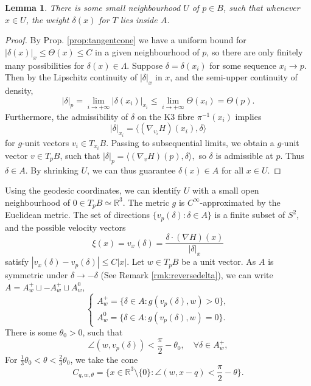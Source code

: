 \documentclass{article}
\newtheorem{lem}[thm]{Lemma}
\theoremstyle{definition}
\newcommand{\R}{\mathbb{R}}
\begin{document}
			\begin{lem}
   There is some small neighbourhood $U$ of $p\in B$, such that whenever $x\in U$,  the weight $\delta(x)$ for $T$ lies inside $A$.
			\end{lem}
			
			\begin{proof}
	By Prop. \ref{prop:tangentcone} we have a uniform bound for $|\delta(x)|_x\leq \Theta(x) \leq C$ in a given neighbourhood of $p$, so there are only finitely many possibilities for $\delta(x)\in \Lambda$. Suppose $\delta=\delta(x_i) $ for some sequence $x_i\to p$. Then by the Lipschitz continuity of $|\delta|_x$ in $x$, and the semi-upper continuity of density,
		\[
		|\delta|_p = \lim_{i\to +\infty} |\delta(x_i)|_{x_i}  \leq  \lim_{i\to +\infty} \Theta(x_i) = \Theta(p).
		\]
		Furthermore, the admissibility of $\delta$ on the K3 fibre $\pi^{-1}(x_i)$ implies
		\[
		|\delta|_{x_i}= \langle (\nabla_{v_i} H)(x_i), \delta\rangle 
		\]
		for $g$-unit vectors $v_i\in T_{x_i} B$. Passing to subsequential limits, we obtain a $g$-unit vector $v\in T_p B$, such that 
	$
			|\delta|_p = \langle (\nabla_{v} H)(p), \delta\rangle ,
	$
		so $\delta$ is admissible at $p$. Thus $\delta\in A$. By shrinking $U$, we can thus guarantee $\delta(x)\in A$ for all $x\in U$.
			\end{proof}
			
			
			
			
		
			
			
			
		Using the geodesic coordinates, we can identify $U$ with a small open neighbourhood of $0\in T_p B\simeq \R^3$.  The metric $g$ is $C^\infty$-approximated by the Euclidean metric. The set of directions
	$
		\{      v_p(\delta):  \delta\in A     \}
$
is a finite subset of $S^2$, and the possible velocity vectors
\[
\xi(x)= v_x(\delta)=  \frac{  \delta\cdot (\nabla H)(x)   }{     |\delta|_x     }
\]
satisfy $|v_x(\delta)- v_p(\delta)| \leq C |x|$. Let $w\in T_p B$ be a unit vector. As $A$ is symmetric under $\delta\to -\delta$ (See Remark \ref{rmk:reversedelta}), 
 we can write $A=A_w^+\sqcup -A_w^+\sqcup A_w^0$, 
 \[
 \begin{cases}
 		A_w^+= \{  \delta\in A:    g(v_p(\delta), w)>0      \},
 		\\
 		A_w^0=   \{  \delta\in A:    g(v_p(\delta), w)=0      \}.
 \end{cases}
 \]
There is some $\theta_0>0$, such that 
\[
\angle (w, v_p(\delta) ) < \frac{\pi}{2}- \theta_0  ,\quad    \forall \delta\in A_w^+,
\]		
For $\frac{1}{3}\theta_0   <\theta<\frac{2}{3}\theta_0$, we take the cone
\[
C_{q, w, \theta}= \{    x\in \R^3\setminus \{  0\} :   \angle( w, x-q )< \frac{\pi}{2}- \theta          \}.
\]
\end{document}
